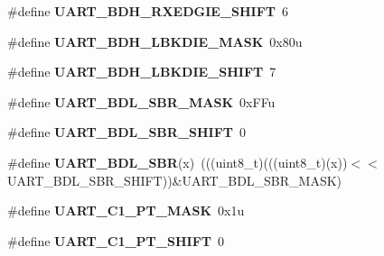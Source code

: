 \begin{DoxyCompactItemize}
\item 
\#define {\bfseries U\+A\+R\+T\+\_\+\+B\+D\+H\+\_\+\+R\+X\+E\+D\+G\+I\+E\+\_\+\+S\+H\+I\+FT}~6\hypertarget{group__UART__Register__Masks_ga97c5d15ae3144492e364744236aa10f7}{}\label{group__UART__Register__Masks_ga97c5d15ae3144492e364744236aa10f7}

\item 
\#define {\bfseries U\+A\+R\+T\+\_\+\+B\+D\+H\+\_\+\+L\+B\+K\+D\+I\+E\+\_\+\+M\+A\+SK}~0x80u\hypertarget{group__UART__Register__Masks_ga88fb29d1cb045a09e851a31c689ef60e}{}\label{group__UART__Register__Masks_ga88fb29d1cb045a09e851a31c689ef60e}

\item 
\#define {\bfseries U\+A\+R\+T\+\_\+\+B\+D\+H\+\_\+\+L\+B\+K\+D\+I\+E\+\_\+\+S\+H\+I\+FT}~7\hypertarget{group__UART__Register__Masks_gace1227bd2507a7c5df95398e097cb7af}{}\label{group__UART__Register__Masks_gace1227bd2507a7c5df95398e097cb7af}

\item 
\#define {\bfseries U\+A\+R\+T\+\_\+\+B\+D\+L\+\_\+\+S\+B\+R\+\_\+\+M\+A\+SK}~0x\+F\+Fu\hypertarget{group__UART__Register__Masks_ga4471e77a5cfda8db1950aac0b204d964}{}\label{group__UART__Register__Masks_ga4471e77a5cfda8db1950aac0b204d964}

\item 
\#define {\bfseries U\+A\+R\+T\+\_\+\+B\+D\+L\+\_\+\+S\+B\+R\+\_\+\+S\+H\+I\+FT}~0\hypertarget{group__UART__Register__Masks_gad59af590652e14fd8d4a0d46ce48205a}{}\label{group__UART__Register__Masks_gad59af590652e14fd8d4a0d46ce48205a}

\item 
\#define {\bfseries U\+A\+R\+T\+\_\+\+B\+D\+L\+\_\+\+S\+BR}(x)~(((uint8\+\_\+t)(((uint8\+\_\+t)(x))$<$$<$U\+A\+R\+T\+\_\+\+B\+D\+L\+\_\+\+S\+B\+R\+\_\+\+S\+H\+I\+FT))\&U\+A\+R\+T\+\_\+\+B\+D\+L\+\_\+\+S\+B\+R\+\_\+\+M\+A\+SK)\hypertarget{group__UART__Register__Masks_ga558b42c8b256ac9201985ce5c618f642}{}\label{group__UART__Register__Masks_ga558b42c8b256ac9201985ce5c618f642}

\item 
\#define {\bfseries U\+A\+R\+T\+\_\+\+C1\+\_\+\+P\+T\+\_\+\+M\+A\+SK}~0x1u\hypertarget{group__UART__Register__Masks_ga5a1c05b549b94de9232fbac665b3f584}{}\label{group__UART__Register__Masks_ga5a1c05b549b94de9232fbac665b3f584}

\item 
\#define {\bfseries U\+A\+R\+T\+\_\+\+C1\+\_\+\+P\+T\+\_\+\+S\+H\+I\+FT}~0\hypertarget{group__UART__Register__Masks_ga1638e7faa5063dab6afd34353fde4c89}{}\label{group__UART__Register__Masks_ga1638e7faa5063dab6afd34353fde4c89}


\end{DoxyCompactItemize}
